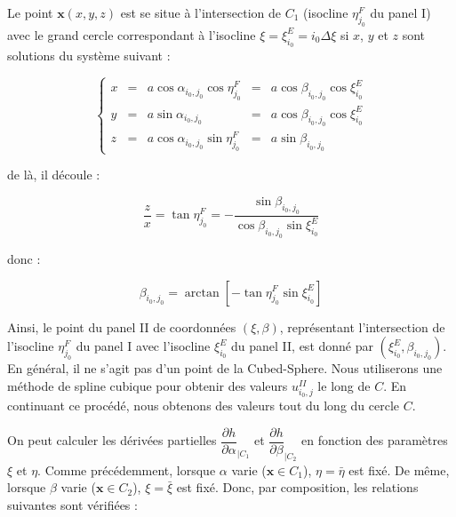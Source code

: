 Le point $\mathbf{x}(x,y,z)$ est se situe à l'intersection de $C_1$ (isocline $\eta^F_{j_0}$ du panel I) avec le grand cercle correspondant à l'isocline $\xi = \xi^E_{i_0} = i_0 \Delta \xi$ si $x$, $y$ et $z$ sont solutions du système suivant :

\begin{equation}
\left\lbrace
\begin{array}{rcccl}
x & = & a \cos \alpha_{i_0, j_0} \cos \eta^F_{j_0} & = & a \cos \beta_{i_0, j_0} \cos \xi^E_{i_0} \\
y & = & a \sin \alpha_{i_0, j_0} & = & a \cos \beta_{i_0, j_0} \cos \xi^E_{i_0} \\
z & = & a \cos \alpha_{i_0, j_0} \sin \eta^F_{j_0}  & = & a \sin \beta_{i_0, j_0}
\end{array}
\right.
\end{equation}

de là, il découle :

\begin{equation}
\dfrac{z}{x} = \tan \eta^F_{j_0} = - \dfrac{\sin \beta_{i_0, j_0}}{\cos \beta_{i_0, j_0} \sin \xi^E_{i_0}}
\end{equation}

donc :

\begin{equation}
\beta_{i_0, j_0} = \arctan \left[ - \tan \eta^F_{j_0} \sin \xi^E_{i_0} \right]
\end{equation}

Ainsi, le point du panel II de coordonnées $(\xi, \beta)$, représentant l'intersection de l'isocline $\eta^F_{j_0}$ du panel I avec l'isocline $\xi_{i_0}^E$ du panel II, est donné par $(\xi^E_{i_0}, \beta_{i_0, j_0})$. En général, il ne s'agit pas d'un point de la Cubed-Sphere. Nous utiliserons une méthode de spline cubique pour obtenir des valeurs $u_{i_0,j}^{II}$ le long de $C$.
En continuant ce procédé, nous obtenons des valeurs tout du long du cercle $C$.







On peut calculer les dérivées partielles $\dfrac{\partial h}{\partial \alpha}_{|C_1}$ et $\dfrac{\partial h}{\partial \beta}_{|C_2}$ en fonction des paramètres $\xi$ et $\eta$. Comme précédemment, lorsque $\alpha$ varie ($\mathbf{x} \in C_1$), $\eta = \bar{\eta}$ est fixé. De même, lorsque $\beta$ varie ($\mathbf{x} \in C_2$), $\xi = \bar{\xi}$ est fixé. Donc, par composition, les relations suivantes sont vérifiées :

